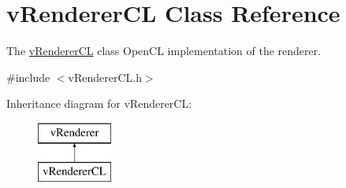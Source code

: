 \hypertarget{classvRendererCL}{\section{v\-Renderer\-C\-L Class Reference}
\label{classvRendererCL}
}


The \hyperlink{classvRendererCL}{v\-Renderer\-C\-L} class Open\-C\-L implementation of the renderer.  




{\ttfamily \#include $<$v\-Renderer\-C\-L.\-h$>$}

Inheritance diagram for v\-Renderer\-C\-L\-:\begin{figure}[H]
\begin{center}
\leavevmode
\includegraphics[height=2.000000cm]{classvRendererCL}
\end{center}
\end{figure}
